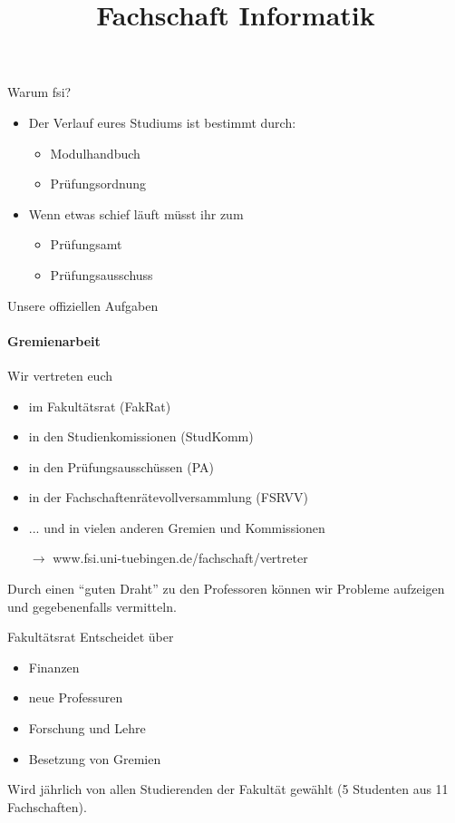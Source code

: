 \documentclass{beamer}
\title{Fachschaft Informatik}
\begin{document}
	\maketitle

	\begin{frame}{Warum fsi?}
		\begin{itemize}
			\item Der Verlauf eures Studiums ist bestimmt durch:
				\begin{itemize}
					\item Modulhandbuch
					\item Prüfungsordnung
				\end{itemize}
			\item Wenn etwas schief läuft müsst ihr zum
				\begin{itemize}
					\item Prüfungsamt
					\item Prüfungsausschuss
				\end{itemize}
		\end{itemize}
	\end{frame}

	\begin{frame}{Unsere offiziellen Aufgaben}
		\framesubtitle{Gremienarbeit}
		Wir vertreten euch
		\begin{itemize}
			\item im Fakultätsrat (FakRat)
			\item in den Studienkomissionen (StudKomm)
			\item in den Prüfungsausschüssen (PA)
			\item in der Fachschaftenrätevollversammlung (FSRVV)
			\item ... und in vielen anderen Gremien und Kommissionen
			\item[$\rightarrow$] www.fsi.uni-tuebingen.de/fachschaft/vertreter
		\end{itemize}
		Durch einen ``guten Draht'' zu den Professoren können wir Probleme aufzeigen und gegebenenfalls vermitteln.
	\end{frame}

	\begin{frame}{Fakultätsrat}
		Entscheidet über
		\begin{itemize}
			\item Finanzen
			\item neue Professuren
			\item Forschung und Lehre
			\item Besetzung von Gremien
		\end{itemize}
		Wird jährlich von allen Studierenden der Fakultät gewählt (5 Studenten aus 11 Fachschaften).
	\end{frame}
\end{document}
